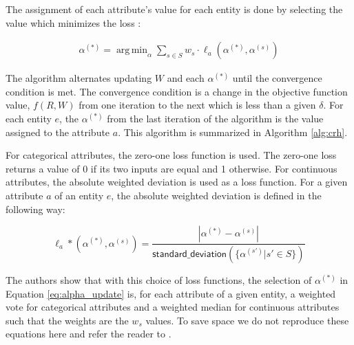 \documentclass{acm_proc_article-sp}
\DeclareMathOperator*{\argmin}{arg\,min}
\begin{document}
The assignment of each attribute's value for each entity is done by selecting the value which minimizes the loss : 

\begin{align} \label{eq:alpha_update}
\alpha^{(*)} = \argmin_\alpha \sum_{s \in S} w_s \cdot \ell_a(\alpha^{(*)}, \alpha^{(s)})
\end{align}

The algorithm alternates updating $W$ and each $\alpha^{(*)}$ until the convergence condition is met. The convergence condition is a change in the objective function value, $f(R,W)$ from one iteration to the next which is less than a given $\delta$.  For each entity $e$, the $\alpha^{(*)}$ from the last iteration of the algorithm is the value assigned to the attribute $a$. This algorithm is summarized in Algorithm \ref{alg:crh}. 

For categorical attributes, the zero-one loss function is used. The zero-one loss returns a value of 0 if its two inputs are equal and 1 otherwise. For continuous attributes, the absolute weighted deviation is used as a loss function. For a given attribute $a$ of an entity $e$, the absolute weighted deviation is defined in the following way: 

\begin{equation}
\ell_a*(\alpha^{(*)}, \alpha^{(s)}) = \frac{|\alpha^{(*)} - \alpha^{(s)}|}{\mathsf{standard\_deviation}(\{\alpha^{(s')} | s' \in S\})}
\end{equation}

The authors show that with this choice of loss functions, the selection of $\alpha^{(*)}$ in Equation \ref{eq:alpha_update} is, for each attribute of a given entity, a weighted vote for categorical attributes and a weighted median for continuous attributes such that the weights are the $w_s$ values. To save space we do not reproduce these equations here and refer the reader to \cite{li:resolving}. 
\end{document}
